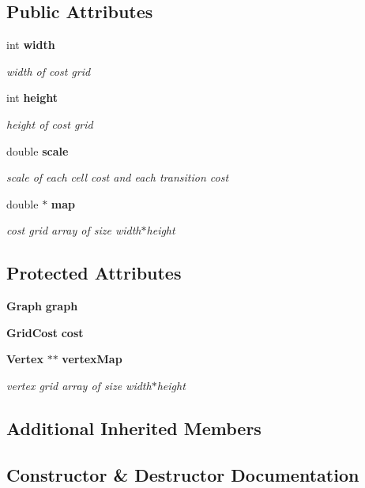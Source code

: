 \subsection*{Public Attributes}
\begin{DoxyCompactItemize}
\item 
int {\bf width}
\begin{DoxyCompactList}\small\item\em width of cost grid \end{DoxyCompactList}\item 
int {\bf height}
\begin{DoxyCompactList}\small\item\em height of cost grid \end{DoxyCompactList}\item 
double {\bf scale}
\begin{DoxyCompactList}\small\item\em scale of each cell cost and each transition cost \end{DoxyCompactList}\item 
double $\ast$ {\bf map}
\begin{DoxyCompactList}\small\item\em cost grid array of size width$\ast$height \end{DoxyCompactList}\end{DoxyCompactItemize}
\subsection*{Protected Attributes}
\begin{DoxyCompactItemize}
\item 
{\bf Graph} {\bf graph}
\item 
{\bf Grid\-Cost} {\bf cost}
\item 
{\bf Vertex} $\ast$$\ast$ {\bf vertex\-Map}
\begin{DoxyCompactList}\small\item\em vertex grid array of size width$\ast$height \end{DoxyCompactList}\end{DoxyCompactItemize}
\subsection*{Additional Inherited Members}


\subsection{Constructor \& Destructor Documentation}
